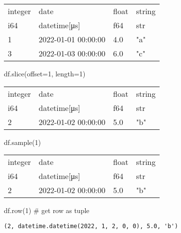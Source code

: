 \documentclass[
  letterpaper,
  DIV=11,
  numbers=noendperiod]{scrartcl}
\newenvironment{Shaded}{\begin{snugshade}}{\end{snugshade}}
\newcommand{\BuiltInTok}[1]{\textcolor[rgb]{0.00,0.23,0.31}{#1}}
\newcommand{\CommentTok}[1]{\textcolor[rgb]{0.37,0.37,0.37}{#1}}
\newcommand{\DecValTok}[1]{\textcolor[rgb]{0.68,0.00,0.00}{#1}}
\newcommand{\NormalTok}[1]{\textcolor[rgb]{0.00,0.23,0.31}{#1}}
\newcommand{\OperatorTok}[1]{\textcolor[rgb]{0.37,0.37,0.37}{#1}}
\begin{document}
\begin{longtable}[]{@{}llll@{}}
\toprule()
integer & date & float & string \\
i64 & datetime{[}μs{]} & f64 & str \\
\midrule()
\endhead
1 & 2022-01-01 00:00:00 & 4.0 & "a" \\
3 & 2022-01-03 00:00:00 & 6.0 & "c" \\
\bottomrule()
\end{longtable}

\begin{Shaded}
\begin{Highlighting}[]
\NormalTok{df.}\BuiltInTok{slice}\NormalTok{(offset}\OperatorTok{=}\DecValTok{1}\NormalTok{, length}\OperatorTok{=}\DecValTok{1}\NormalTok{)}
\end{Highlighting}
\end{Shaded}

\begin{longtable}[]{@{}llll@{}}
\toprule()
integer & date & float & string \\
i64 & datetime{[}μs{]} & f64 & str \\
\midrule()
\endhead
2 & 2022-01-02 00:00:00 & 5.0 & "b" \\
\bottomrule()
\end{longtable}

\begin{Shaded}
\begin{Highlighting}[]
\NormalTok{df.sample(}\DecValTok{1}\NormalTok{)}
\end{Highlighting}
\end{Shaded}

\begin{longtable}[]{@{}llll@{}}
\toprule()
integer & date & float & string \\
i64 & datetime{[}μs{]} & f64 & str \\
\midrule()
\endhead
2 & 2022-01-02 00:00:00 & 5.0 & "b" \\
\bottomrule()
\end{longtable}

\begin{Shaded}
\begin{Highlighting}[]
\NormalTok{df.row(}\DecValTok{1}\NormalTok{) }\CommentTok{\# get row as tuple}
\end{Highlighting}
\end{Shaded}

\begin{verbatim}
(2, datetime.datetime(2022, 1, 2, 0, 0), 5.0, 'b')
\end{verbatim}
\end{document}
